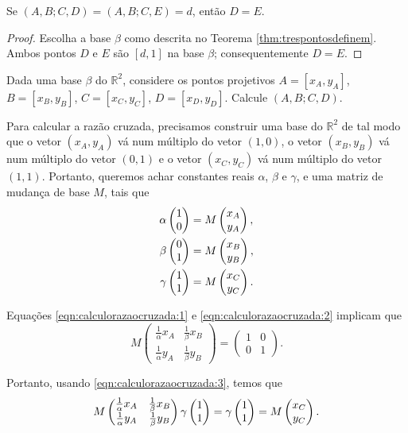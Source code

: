 \begin{prop} \label{prop:rc_inj}
  Se \((A, B; C, D) = (A, B; C, E) = d\), então  \(D = E\).
\end{prop}
\begin{proof}
  Escolha a base \(\beta\) como descrita no Teorema \ref{thm:trespontosdefinem}. Ambos pontos \(D\) e \(E\) são \([d, 1]\) na base \(\beta\); consequentemente \(D = E\).
\end{proof}

\begin{exer}
Dada uma base \(\beta\) do \(\mathbb{R}^2\), considere os pontos projetivos $A = [x_A,y_A]$, $B = [x_B,y_B]$, $C = [x_C,y_C]$, $D = [x_D,y_D]$.
Calcule $(A,B;C,D)$.
\end{exer}
\begin{sol}
  Para calcular a razão cruzada, precisamos construir uma base do $\mathbb{R}^2$ de tal modo que o vetor $(x_A,y_A)$ vá num múltiplo do vetor $(1,0)$, o vetor $(x_B,y_B)$ vá num múltiplo do vetor $(0,1)$ e o vetor $(x_C,y_C)$ vá num múltiplo do vetor $(1,1)$.
  Portanto, queremos achar constantes reais \(\alpha\), \(\beta\) e \(\gamma\), e uma matriz de mudança de base \(M\), tais que 
    \begin{align}
      \alpha \begin{pmatrix} 1 \\ 0 \\  \end{pmatrix} &= M \begin{pmatrix} x_A \\ y_A \\  \end{pmatrix} \label{eqn:calculorazaocruzada:1}, \\
      \beta  \begin{pmatrix} 0 \\ 1 \\  \end{pmatrix} &= M \begin{pmatrix} x_B \\ y_B \\  \end{pmatrix} \label{eqn:calculorazaocruzada:2}, \\
      \gamma \begin{pmatrix} 1 \\ 1 \\  \end{pmatrix} &= M \begin{pmatrix} x_C \\ y_C \\  \end{pmatrix} \label{eqn:calculorazaocruzada:3}. 
    \end{align} 

  Equações \ref{eqn:calculorazaocruzada:1} e \ref{eqn:calculorazaocruzada:2} implicam que
  \begin{equation} \label{eqn:calculorazaocruzada:4}
    M \begin{pmatrix} \frac{1}{\alpha} x_A& \frac{1}{\beta} x_B\\ \frac{1}{\alpha} y_A& \frac{1}{\beta} y_B \end{pmatrix} 
    = \begin{pmatrix} 1 & 0 \\ 0 & 1 \end{pmatrix}.
  \end{equation}

  Portanto, usando \ref{eqn:calculorazaocruzada:3}, temos que
  \begin{equation}
    M \begin{pmatrix} \frac{1}{\alpha} x_A& \frac{1}{\beta} x_B\\ \frac{1}{\alpha} y_A& \frac{1}{\beta} y_B \end{pmatrix} \gamma \begin{pmatrix} 1 \\ 1 \\  \end{pmatrix}
    = \gamma \begin{pmatrix} 1 \\ 1 \\  \end{pmatrix}
    = M \begin{pmatrix} x_C \\ y_C \\  \end{pmatrix}.
  \end{equation}


\end{sol}
